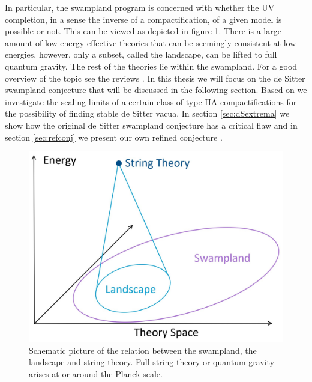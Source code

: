 \documentclass[a4paper,12pt,twoside,openright]{report}
\begin{document}
In particular, the swampland program is concerned with whether the UV completion, in a sense the inverse of a compactification, of a given model is possible or not. This can be viewed as depicted in figure \ref{fig:swamppic}. There is a large amount of low energy effective theories that can be seemingly consistent at low energies, however, only a subset, called the landscape, can be lifted to full quantum gravity. The rest of the theories lie within the swampland. For a good overview of the topic see the reviews \cite{Brennan:2017rbf,Palti:2019pca,vanBeest:2021lhn}. In this thesis we will focus on the de Sitter swampland conjecture that will be discussed in the following section. Based on \cite{Banlaki:2018ayh} we investigate the scaling limits of a certain class of type IIA compactifications for the possibility of finding stable de Sitter vacua. In section \ref{sec:dSextrema} we show how the original de Sitter swampland conjecture has a critical flaw \cite{Roupec:2018mbn} and in section \ref{sec:refconj} we present our own refined conjecture \cite{Andriot:2018mav}.
\begin{figure}[htb]
     \centering
     \includegraphics[scale=0.7]{swamppic.jpg}
     \caption{Schematic picture of the relation between the swampland, the landscape and string theory. Full string theory or quantum gravity arises at or around the Planck scale.}
     \label{fig:swamppic}
\end{figure}
\end{document}
